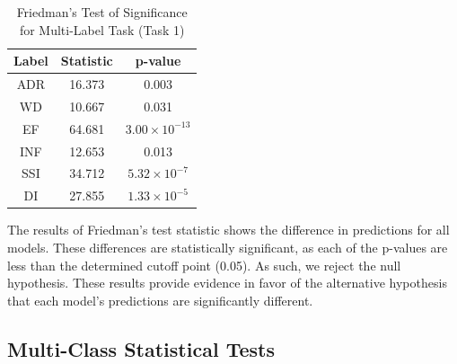 \documentclass[10.7pt, onecolumn]{article}
\begin{document}
\begin{table}[H]
  \centering
  \small
  \begin{tabular}{|c|c|c|}
  \hline
  \textbf{Label} & \textbf{Statistic} & \textbf{p-value} \\ 
  \hline
  ADR & 16.373 & 0.003 \\ 
  \hline
  WD & 10.667 & 0.031 \\ 
  \hline
  EF & 64.681 & $3.00 \times 10^{-13}$ \\ 
  \hline
  INF & 12.653 & 0.013 \\ \hline
  SSI & 34.712 & $5.32 \times 10^{-7}$ \\ 
  \hline
  DI & 27.855 & $1.33 \times 10^{-5}$ \\ 
  \hline
  \end{tabular}
  \caption{Friedman's Test of Significance for Multi-Label Task (Task 1)}
  \label{tab:friedmansTest}
\end{table}

The results of Friedman's test statistic shows the difference in predictions for all models. These differences are statistically significant, as each of the p-values are less than the determined cutoff point (0.05). As such, we reject the null hypothesis. These results provide evidence in favor of the alternative hypothesis that each model's predictions are significantly different.


\subsection{Multi-Class Statistical Tests}
\end{document}
